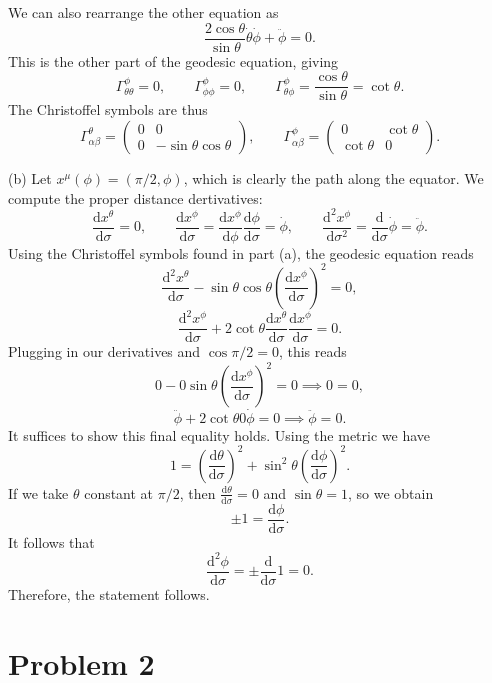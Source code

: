 \documentclass[11pt, letterpaper]{article}
\theoremstyle{plain}
\begin{document}
We can also rearrange the other equation as
\[
	\frac{2 \cos \theta }{\sin \theta } \dot{\theta } \dot{\phi } + \ddot{\phi } =0
.\]
This is the other part of the geodesic equation, giving
\[
	\Gamma ^\phi _{\theta \theta } =0,\qquad \Gamma ^\phi _{\phi \phi } =0,\qquad \Gamma ^\phi _{\theta \phi } = \frac{\cos \theta }{\sin \theta } =\cot \theta 
.\]
The Christoffel symbols are thus
\[
	\Gamma ^\theta_{\alpha \beta } =\begin{pmatrix}
	0 & 0 \\
	0 & -\sin \theta \cos \theta 
	\end{pmatrix},\qquad \Gamma ^\phi _{\alpha \beta } =\begin{pmatrix}
	0 &  \cot \theta  \\
	\cot \theta  & 0
	\end{pmatrix}
.\]

(b) Let $x^\mu (\phi )=(\pi /2,\phi )$, which is clearly the path along the equator. We compute the proper distance dertivatives:
\[
	\frac{\mathrm{d}x^\theta }{\mathrm{d}\sigma } =0,\qquad \frac{\mathrm{d}x^\phi }{\mathrm{d}\sigma } = \frac{\mathrm{d}x^\phi }{\mathrm{d}\phi } \frac{\mathrm{d}\phi }{\mathrm{d}\sigma } =\dot{\phi } ,\qquad \frac{\mathrm{d}^2x^\phi }{\mathrm{d}\sigma ^2} = \frac{\mathrm{d}}{\mathrm{d}\sigma } \dot{\phi } =\ddot{\phi }
.\]
Using  the Christoffel symbols found in part (a), the geodesic equation reads
\[
	\frac{\mathrm{d}^2x^\theta }{\mathrm{d}\sigma }  - \sin \theta \cos \theta \left(\frac{\mathrm{d}x^\phi }{\mathrm{d}\sigma }\right)^2=0,
\]
\[
	\frac{\mathrm{d}^2x^\phi }{\mathrm{d}\sigma } + 2 \cot \theta \frac{\mathrm{d}x^\theta }{\mathrm{d}\sigma } \frac{\mathrm{d}x^\phi }{\mathrm{d}\sigma }  =0
.\]
Plugging in our derivatives and $\cos \pi /2=0$, this reads
\[
	0 - 0 \sin \theta \left( \frac{\mathrm{d}x^\phi }{\mathrm{d}\sigma }  \right) ^2=0 \implies 0=0,
\]
\[
	\ddot{\phi } + 2 \cot \theta 0 \dot{\phi } =0 \implies \ddot{\phi } =0
.\]
It suffices to show this final equality holds. Using the metric we have
\[
	1=\left(\frac{\mathrm{d}\theta }{\mathrm{d}\sigma }\right)^2 + \sin ^2\theta \left(\frac{\mathrm{d}\phi }{\mathrm{d}\sigma }\right)^2
.\]
If we take $\theta $ constant at $\pi /2$, then $\frac{\mathrm{d}\theta }{\mathrm{d}\sigma } =0$ and $\sin \theta =1$, so we obtain
\[
	\pm1= \frac{\mathrm{d}\phi }{\mathrm{d}\sigma } 
.\]
It follows that
\[
	\frac{\mathrm{d}^2 \phi }{\mathrm{d}\sigma } = \pm\frac{\mathrm{d}}{\mathrm{d}\sigma } 1=0
.\]
Therefore, the statement follows.

\section{Problem 2}
\end{document}
